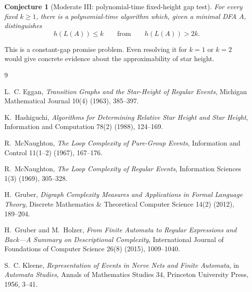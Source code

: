 \documentclass[11pt]{article}
\newtheorem{conjecture}{Conjecture}
\begin{document}
\begin{conjecture}[Moderate III: polynomial-time fixed-height gap test]
For every fixed $k\geq1$, there is a polynomial-time algorithm which, given a
minimal DFA $A$, distinguishes
\[
 h(L(A))\leq k
 \qquad\text{from}\qquad
 h(L(A))>2k.
\]
\end{conjecture}

This is a constant-gap promise problem. Even resolving it for $k=1$ or $k=2$
would give concrete evidence about the approximability of star height.


\begin{thebibliography}{9}

L.~C. Eggan,
\emph{Transition Graphs and the Star-Height of Regular Events},
Michigan Mathematical Journal 10(4) (1963), 385--397.

K.~Hashiguchi,
\emph{Algorithms for Determining Relative Star Height and Star Height},
Information and Computation 78(2) (1988), 124--169.

R.~McNaughton,
\emph{The Loop Complexity of Pure-Group Events},
Information and Control 11(1--2) (1967), 167--176.

R.~McNaughton,
\emph{The Loop Complexity of Regular Events},
Information Sciences 1(3) (1969), 305--328.

H.~Gruber,
\emph{Digraph Complexity Measures and Applications in Formal Language
Theory},
Discrete Mathematics \& Theoretical Computer Science 14(2) (2012),
189--204.

H.~Gruber and M.~Holzer,
\emph{From Finite Automata to Regular Expressions and Back---A Summary on
Descriptional Complexity},
International Journal of Foundations of Computer Science 26(8) (2015),
1009--1040.

S.~C. Kleene,
\emph{Representation of Events in Nerve Nets and Finite Automata},
in \emph{Automata Studies}, Annals of Mathematics Studies 34,
Princeton University Press, 1956, 3--41.

\end{thebibliography}
\end{document}
